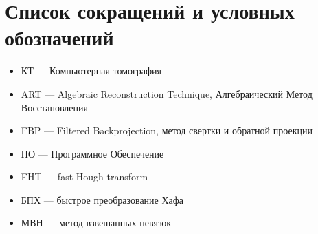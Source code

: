 \chapter*{Список сокращений и условных обозначений}
\begin{itemize}
\item КТ --- Компьютерная томография
\item ART --- Algebraic Reconstruction Technique, Алгебраический Метод Восстановления
\item FBP --- Filtered Backprojection, метод свертки и обратной проекции
\item ПО --- Программное Обеспечение
\item FHT --- fast Hough transform
\item БПХ --- быстрое преобразование Хафа
\item МВН --- метод взвешанных невязок
\end{itemize}


